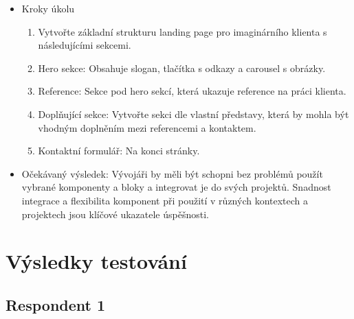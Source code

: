 \begin{enumerate}
\begin{itemize}
    \item Kroky úkolu
    \begin{enumerate}
      \item Vytvořte základní strukturu landing page pro imaginárního klienta s následujícími sekcemi.
      \item Hero sekce: Obsahuje slogan, tlačítka s odkazy a carousel s obrázky.
      \item Reference: Sekce pod hero sekcí, která ukazuje reference na práci klienta.
      \item Doplňující sekce: Vytvořte sekci dle vlastní představy, která by mohla být vhodným doplněním mezi referencemi a kontaktem.
      \item Kontaktní formulář: Na konci stránky.
    \end{enumerate}
    \item Očekávaný výsledek: Vývojáři by měli být schopni bez problémů použít vybrané komponenty a bloky a integrovat je do svých projektů. Snadnost integrace a flexibilita komponent při použití v různých kontextech a projektech jsou klíčové ukazatele úspěšnosti.
  \end{itemize}
\end{enumerate}

\section{Výsledky testování}

\subsection{Respondent 1}

